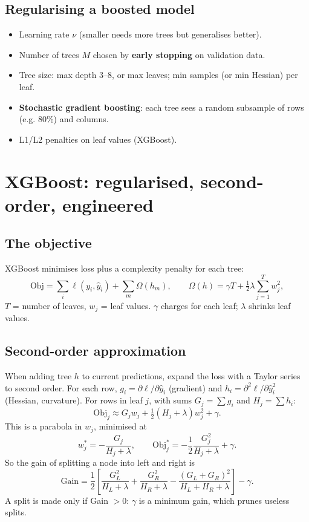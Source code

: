 \subsection{Regularising a boosted model}
\begin{itemize}
\item Learning rate $\nu$ (smaller needs more trees but generalises better).
\item Number of trees $M$ chosen by \textbf{early stopping} on validation data.
\item Tree size: max depth 3--8, or max leaves; min samples (or min Hessian) per leaf.
\item \textbf{Stochastic gradient boosting}: each tree sees a random subsample of rows (e.g. 80\%) and columns.
\item L1/L2 penalties on leaf values (XGBoost).
\end{itemize}

\section{XGBoost: regularised, second-order, engineered}

\subsection{The objective}
XGBoost minimises loss plus a complexity penalty for each tree:
\[ \text{Obj} = \sum_i\ell(y_i, \hat y_i) + \sum_m\Omega(h_m),\qquad \Omega(h) = \gamma T + \tfrac12\lambda\sum_{j=1}^Tw_j^2, \]
$T$ = number of leaves, $w_j$ = leaf values. $\gamma$ charges for each leaf; $\lambda$ shrinks leaf values.

\subsection{Second-order approximation}
When adding tree $h$ to current predictions, expand the loss with a Taylor series to second order. For each row,
$g_i = \partial\ell/\partial\hat y_i$ (gradient) and $h_i = \partial^2\ell/\partial\hat y_i^2$ (Hessian, curvature). For rows in leaf
$j$, with sums $G_j = \sum g_i$ and $H_j = \sum h_i$:
\[ \text{Obj}_j \approx G_jw_j + \tfrac12(H_j + \lambda)w_j^2 + \gamma. \]
This is a parabola in $w_j$, minimised at
\[ \boxed{w_j^* = -\frac{G_j}{H_j + \lambda}},\qquad \text{Obj}_j^* = -\frac12\frac{G_j^2}{H_j + \lambda} + \gamma. \]
So the gain of splitting a node into left and right is
\[ \boxed{\text{Gain} = \frac12\left[\frac{G_L^2}{H_L + \lambda} + \frac{G_R^2}{H_R + \lambda} - \frac{(G_L + G_R)^2}{H_L + H_R + \lambda}\right] - \gamma.} \]
A split is made only if Gain $> 0$: $\gamma$ is a minimum gain, which prunes useless splits.

